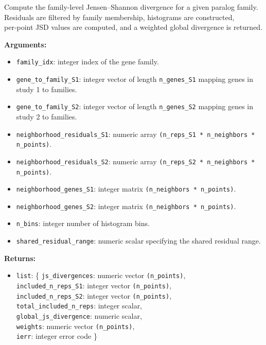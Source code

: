 \begin{enumerate}
        Compute the family-level Jensen–Shannon divergence for a given paralog family.  
        Residuals are filtered by family membership, histograms are constructed, per‑point JSD values are computed, and a weighted global divergence is returned.

        \textbf{Arguments:}
        \begin{itemize}
            \item \lstinline!family_idx!: integer index of the gene family.
            \item \lstinline!gene_to_family_S1!: integer vector of length \lstinline!n_genes_S1! mapping genes in study 1 to families.
            \item \lstinline!gene_to_family_S2!: integer vector of length \lstinline!n_genes_S2! mapping genes in study 2 to families.
            \item \lstinline!neighborhood_residuals_S1!: numeric array \lstinline!(n_reps_S1 * n_neighbors * n_points)!.
            \item \lstinline!neighborhood_residuals_S2!: numeric array \lstinline!(n_reps_S2 * n_neighbors * n_points)!.
            \item \lstinline!neighborhood_genes_S1!: integer matrix \lstinline!(n_neighbors * n_points)!.
            \item \lstinline!neighborhood_genes_S2!: integer matrix \lstinline!(n_neighbors * n_points)!.
            \item \lstinline!n_bins!: integer number of histogram bins.
            \item \lstinline!shared_residual_range!: numeric scalar specifying the shared residual range.
        \end{itemize}

        \textbf{Returns:}
        \begin{itemize}
            \item \lstinline!list!: \{
                \lstinline!js_divergences!: numeric vector \lstinline!(n_points)!,\\
                \lstinline!included_n_reps_S1!: integer vector \lstinline!(n_points)!,\\
                \lstinline!included_n_reps_S2!: integer vector \lstinline!(n_points)!,\\
                \lstinline!total_included_n_reps!: integer scalar,\\
                \lstinline!global_js_divergence!: numeric scalar,\\
                \lstinline!weights!: numeric vector \lstinline!(n_points)!,\\
                \lstinline!ierr!: integer error code
            \}
        \end{itemize}


\end{enumerate}
